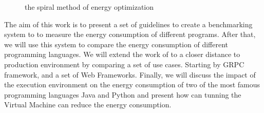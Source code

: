 \begin{figure}[!hbt]
    \caption{the spiral method of energy optimization }\label{fig:spirals}
\end{figure}

The aim of this work is to present a set of guidelines to create a benchmarking system to to measure the energy consumption of different programs.
After that, we will use this system to compare the energy consumption of different programming languages. We will extend the work of \citeauthor{pereira2017energy} to a closer distance to production environment by comparing a set of use cases.
Starting by GRPC framework, and a set of Web Frameworks.
Finally, we will discuss the impact of the execution environment on the energy consumption of two of the most famous programming languages Java and Python and present how can tunning the Virtual Machine can reduce the energy consumption.
